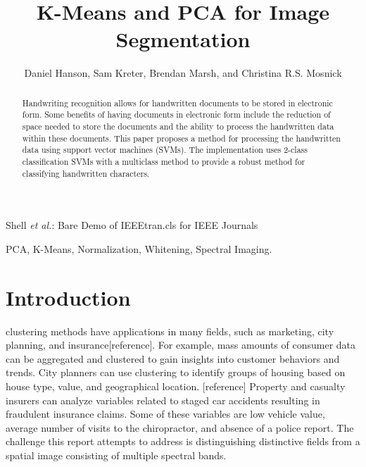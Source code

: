 \documentclass[journal]{IEEEtran}
\begin{document}
\title{K-Means and PCA for Image\\ Segmentation}


\author{Daniel Hanson, Sam Kreter, Brendan Marsh, and Christina R.S. Mosnick}

{Shell \MakeLowercase{\textit{et al.}}: Bare Demo of IEEEtran.cls for IEEE Journals}

\maketitle

\begin{abstract}
Handwriting recognition allows for handwritten documents to be stored in electronic form. Some benefits of having documents in electronic form include the reduction of space needed to store the documents and the ability to process the handwritten data within these documents. This paper proposes a method for processing the handwritten data using support vector machines (SVMs). The implementation uses 2-class classification SVMs with a multiclass method to provide a robust method for classifying handwritten characters.
\end{abstract}

\begin{IEEEkeywords}
    PCA, K-Means, Normalization, Whitening, Spectral Imaging.
\end{IEEEkeywords}

\IEEEpeerreviewmaketitle

\section{Introduction}

 clustering methods have applications in many fields, such as marketing, city planning, and insurance[reference].  For example, mass amounts of consumer data can be aggregated and clustered to gain insights into customer behaviors and trends.  City planners can use clustering to identify groups of housing based on house type, value, and geographical location.  [reference]  Property and casualty insurers can analyze variables related to staged car accidents resulting in fraudulent insurance claims.  Some of these variables are low vehicle value, average number of visits to the chiropractor, and absence of a police report.  The challenge this report attempts to address is distinguishing distinctive fields from a spatial image consisting of multiple spectral bands.\\
\end{document}
